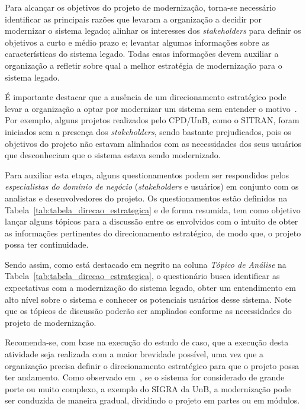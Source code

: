 Para alcançar os objetivos 
do projeto de modernização, torna-se necessário
identificar as principais razões que levaram 
a organização a decidir por modernizar 
o sistema legado; alinhar os 
interesses dos \textit{stakeholders} para
definir os objetivos a curto e médio prazo e;
levantar algumas informações sobre as características 
do sistema legado. Todas essas informações
devem auxiliar a organização a refletir
sobre qual a melhor estratégia de modernização para o 
sistema legado. 

É importante destacar
que a ausência de um 
direcionamento estratégico pode levar 
a organização a optar por modernizar um sistema 
sem entender o motivo~\cite{S4_bennett1995legacy}. 
Por exemplo, alguns projetos realizados 
pelo CPD/UnB, como o \acrfull{SITRAN}, 
foram iniciados sem 
a presença dos \textit{stakeholders},
sendo bastante prejudicados, 
pois os objetivos do projeto não
estavam alinhados com as necessidades 
dos seus usuários que 
desconheciam que o sistema estava sendo modernizado.

Para auxiliar esta etapa, 
alguns questionamentos 
podem ser respondidos pelos \emph{especialistas do 
domínio de negócio} (\textit{stakeholders} e usuários)
em conjunto com os analistas e desenvolvedores do projeto.
Os questionamentos estão definidos na 
Tabela~\ref{tab:tabela_direcao_estrategica}
e de forma resumida, tem como objetivo
lançar alguns tópicos para a discussão
entre os envolvidos
com o intuito de obter as informações pertinentes 
do direcionamento estratégico, de modo que, 
o projeto possa ter continuidade. 

Sendo assim, como está destacado em negrito
na coluna \emph{Tópico de Análise}
na Tabela~\ref{tab:tabela_direcao_estrategica},
o questionário busca identificar
as expectativas com a
modernização do sistema legado, obter um 
entendimento em alto nível sobre o sistema e
conhecer os potenciais usuários desse sistema. 
Note que os tópicos de discussão poderão
ser ampliados conforme as necessidades do 
projeto de modernização.





Recomenda-se, com base na execução do estudo de caso,
que a execução desta atividade 
seja realizada com a maior brevidade possível, 
uma vez que a organização precisa definir o direcionamento
estratégico para que o projeto possa ter andamento.
Como observado em~\cite{S2_erlikh:2000},
se o sistema for considerado 
de grande porte ou muito complexo, 
a exemplo do
\acrfull{SIGRA} da \acrshort{UnB},
a modernização pode ser conduzida 
de maneira gradual, dividindo o 
projeto em partes ou em módulos.

